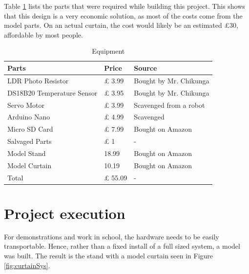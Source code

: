 \documentclass[a4paper,12pt]{article}
\begin{document}
Table \ref{tab:equipment} lists the parts that were required while building this project. This shows that this design is a very economic solution,
as most of the costs come from the model parts. On an actual curtain, the cost would likely be an estimated £30, affordable by most people.

\begin{table}[h!]
    \caption{Equipment}
    \begin{tabular}{l | l | l}
        Parts & Price & Source \\
        \hline
        LDR Photo Resistor & £ 3.99 & Bought by Mr. Chikunga \\
        DS18B20 Temperature Sensor & £ 3.95 & Bought by Mr. Chikunga \\
        Servo Motor & £ 3.99 & Scavenged from a robot \\
        Arduino Nano & £ 4.99 & Scavenged \\
        Micro SD Card & £ 7.99 & Bought on Amazon \\
        Salvaged Parts & £ 1 & - \\
        Model Stand & 18.99 & Bought on Amazon \\
        Model Curtain & 10.19 & Bought on Amazon \\
        Total & £ 55.09 & - \\
    \end{tabular}
    \label{tab:equipment}
\end{table}

\section{Project execution}

For demonstrations and work in school, the hardware needs to be easily transportable. Hence, rather than a fixed install of a full sized system,  a model was built. 
The result is the stand with a model curtain seen in Figure \ref{fig:curtainSys}.
\end{document}
